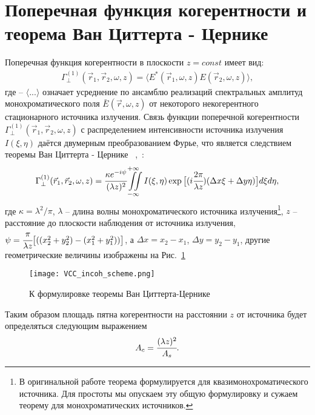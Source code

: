 \section{Поперечная функция когерентности и теорема Ван Циттерта - Цернике}
Поперечная функция когерентности в плоскости $z = const$ имеет вид:
\begin{align}
	\Gamma^{(1)}_{\perp} (\vec{r}_1, \vec{r}_2, \omega, z) = \big \langle {E}^*(\vec{r}_1, \omega, z) {E}(\vec{r}_2, \omega, z) \big \rangle,
	\label{eq:g1} 
\end{align}
где -- $\big \langle ... \big \rangle$ означает усреднение по ансамблю реализаций спектральных амплитуд монохроматического поля $\bar{E}(\vec{r}, \omega, z)$ от некоторого некогерентного стационарного источника излучения. Связь функции поперечной когерентности $\Gamma^{(1)}_{\perp} (\vec{r}_1, \vec{r}_2, \omega, z)$ с распределением интенсивности источника излучения $I(\xi, \eta)$ даётся двумерным преобразованием Фурье, что является следствием теоремы Ван Циттерта - Цернике ~\cite{van_cittert_wahrscheinliche_1934},~\cite{zernike_concept_1938}:
\begin{align}
	\Gamma^{(1)}_{\perp} (\vec{r}_1, \vec{r}_2, \omega, z) = \cfrac{\kappa e^{-i\psi}}{({\lambda}z)^2} \iint \limits_{-\infty}^{+\infty} I(\xi, \eta) \exp{\big [(i \cfrac{2 \pi}{{\lambda}z}) (\Delta x \xi + \Delta y \eta)\big]}d\xi d\eta, 
	\label{eq:van_cittert_zernike_theorem} 
\end{align}
где $\kappa = {\lambda}^2 / \pi$, ${\lambda}$ -- длина волны монохроматического источника излучения\footnote{В оригинальной работе теорема формулируется для квазимонохроматического источника. Для простоты мы опускаем эту общую формулировку и сужаем теорему для монохроматических источников.}, $z$ -- расстояние до плоскости наблюдения от источника излучения, $\psi = \cfrac{\pi}{{\lambda} z}\big[((x^2_2 + y^2_2) - (x^2_1 + y^2_1)) \big]$, а $\Delta x = x_2 - x_1$, $\Delta y = y_2 - y_1$, другие геометрические величины изображены на Рис.~\ref{fig:VCC_scheme_incoh} 
\begin{figure}[H] 
	\centering 	\texttt{[image: VCC\_incoh\_scheme.png]}
	\caption{К формулировке теоремы Ван Циттерта-Цернике}
	\label{fig:VCC_scheme_incoh}
\end{figure}
Таким образом площадь пятна когерентности на расстоянии $z$ от источника будет определяться следующим выражением
\begin{align}
	A_c = \cfrac{({\lambda} z)^2}{A_s}.
	\label{eq:VCC}
\end{align}

